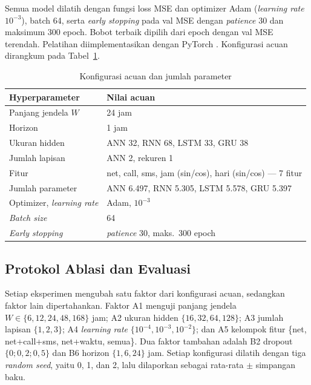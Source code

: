 \documentclass[conference,a4paper]{IEEEtran}
\begin{document}
Semua model dilatih dengan fungsi loss MSE dan optimizer Adam (\textit{learning rate} $10^{-3}$), batch 64, serta \textit{early stopping} pada val MSE dengan \textit{patience} 30 dan maksimum 300 epoch. Bobot terbaik dipilih dari epoch dengan val MSE terendah. Pelatihan diimplementasikan dengan PyTorch \cite{paszke2019pytorch}. Konfigurasi acuan dirangkum pada Tabel~\ref{tab:acuan}.

\begin{table}[t]
  \centering
  \caption{Konfigurasi acuan dan jumlah parameter}
  \label{tab:acuan}
  \begin{tabular}{@{}ll@{}}
    \toprule
    Hyperparameter & Nilai acuan \\
    \midrule
    Panjang jendela $W$ & 24 jam \\
    Horizon & 1 jam \\
    Ukuran hidden & ANN 32, RNN 68, LSTM 33, GRU 38 \\
    Jumlah lapisan & ANN 2, rekuren 1 \\
    Fitur & net, call, sms, jam (sin/cos), hari (sin/cos) --- 7 fitur \\
    Jumlah parameter & ANN 6.497, RNN 5.305, LSTM 5.578, GRU 5.397 \\
    Optimizer, \textit{learning rate} & Adam, $10^{-3}$ \\
    \textit{Batch size} & 64 \\
    \textit{Early stopping} & \textit{patience} 30, maks.\ 300 epoch \\
    \bottomrule
  \end{tabular}
\end{table}

\subsection{Protokol Ablasi dan Evaluasi}

Setiap eksperimen mengubah satu faktor dari konfigurasi acuan, sedangkan faktor lain dipertahankan. Faktor A1 menguji panjang jendela $W \in \{6, 12, 24, 48, 168\}$ jam; A2 ukuran hidden $\{16, 32, 64, 128\}$; A3 jumlah lapisan $\{1, 2, 3\}$; A4 \textit{learning rate} $\{10^{-4}, 10^{-3}, 10^{-2}\}$; dan A5 kelompok fitur \{net, net+call+sms, net+waktu, semua\}. Dua faktor tambahan adalah B2 dropout $\{0; 0,2; 0,5\}$ dan B6 horizon $\{1, 6, 24\}$ jam. Setiap konfigurasi dilatih dengan tiga \textit{random seed}, yaitu 0, 1, dan 2, lalu dilaporkan sebagai rata-rata $\pm$ simpangan baku.
\end{document}
